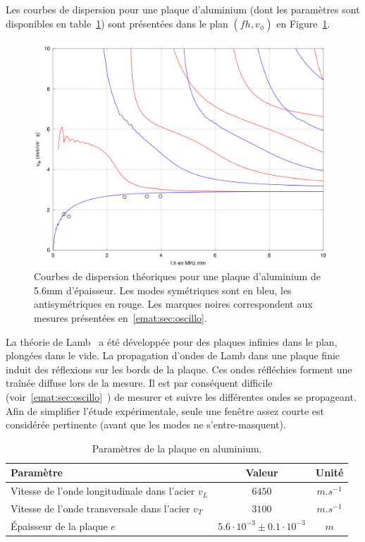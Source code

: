 Les courbes de dispersion pour une plaque d'aluminium (dont les paramètres sont disponibles en table~\ref{emat:params_alu}) sont présentées dans le plan $(fh,v_\phi)$ en Figure~\ref{emat:disper_alu}.

\begin{figure}
	\centering
	\includegraphics[width=0.8\linewidth]{me_figs/dispercurves_aluminium.png}
	\caption{Courbes de dispersion théoriques pour une plaque d'aluminium de 5.6mm
	d'épaisseur. Les modes symétriques sont en bleu, les antisymétriques en rouge. Les
	marques noires correspondent aux mesures présentées en~\ref{emat:sec:oscillo}.}
	\label{emat:disper_alu}
\end{figure}

La théorie de Lamb~\autocite{lamb_waves_1917} a été développée pour des plaques infinies
dans le plan, plongées dans le vide. La propagation d'ondes de Lamb dans une plaque finie induit des réflexions sur les bords de la plaque. Ces ondes réfléchies forment une traînée diffuse lors de la mesure. Il est par conséquent difficile (voir~\ref{emat:sec:oscillo}~) de mesurer et suivre les différentes ondes se propageant. Afin de simplifier l'étude expérimentale, seule une fenêtre assez courte est considérée pertinente (avant que les modes ne s'entre-masquent).


\begin{table}[t]
    \centering
    \begin{tabular}{l|cc}
        Paramètre & Valeur & Unité\\\hline
        Vitesse de l'onde longitudinale dans l'acier $v_L$ & $6450$ & $m.s^{-1}$\\
        Vitesse de l'onde transversale dans l'acier $v_T$ & $3100$ & $m.s^{-1}$\\
        Épaisseur de la plaque $e$ & $5.6\cdot 10^{-3} \pm 0.1\cdot 10^{-3}$ & $m$\\
    \end{tabular}
    \caption{Paramètres de la plaque en aluminium.}
    \label{emat:params_alu}
\end{table}

